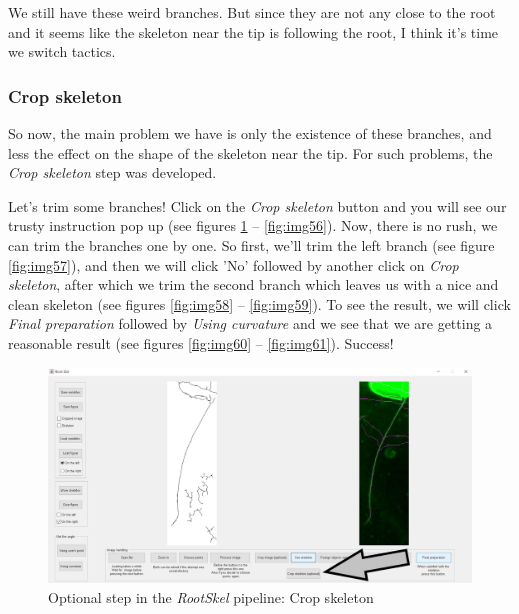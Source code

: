 We still have these weird branches. But since they are not any close to the root and it seems like the skeleton near the tip is following the root, I think it's time we switch tactics.

\subsubsection{Crop skeleton}

So now, the main problem we have is only the existence of these branches, and less the effect on the shape of the skeleton near the tip. For such problems, the \textit{Crop skeleton} step was developed. 

Let's trim some branches! Click on the \textit{Crop skeleton} button and you will see our trusty instruction pop up (see figures \ref{fig:img55} -- \ref{fig:img56}).
Now, there is no rush, we can trim the branches one by one. So first, we'll trim the left branch (see figure \ref{fig:img57}), and then we will click 'No' followed by another click on \textit{Crop skeleton}, after which we trim the second branch which leaves us with a nice and clean skeleton (see figures \ref{fig:img58} -- \ref{fig:img59}).
To see the result, we will click \textit{Final preparation} followed by \textit{Using curvature} and we see that we are getting a reasonable result (see figures \ref{fig:img60} -- \ref{fig:img61}). Success!


\begin{figure}[H]
	\centering
	\includegraphics[width=\textwidth]{../Figures/manual/optionalD1.jpg}
	\caption{Optional step in the \textit{RootSkel} pipeline: Crop skeleton}
	\label{fig:img55}
\end{figure}

